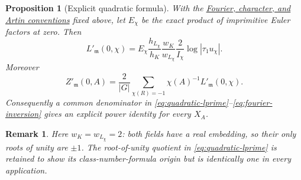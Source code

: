 \documentclass[11pt]{article}
\newtheorem{proposition}[theorem]{Proposition}
\newtheorem{remark}[theorem]{Remark}
\begin{document}
\begin{proposition}[Explicit quadratic formula]\label{prop:A}
With the \hyperref[par:conventions]{Fourier, character, and Artin
conventions} fixed above, let
\(E_\chi\) be the exact product of imprimitive Euler factors at zero.
Then
\begin{equation}\label{eq:quadratic-lprime}
 L'_{\mathfrak m}(0,\chi)=
 E_\chi\frac{h_{L_\chi}}{h_K}
 \frac{w_K}{w_{L_\chi}}\frac{2}{I_\chi}
 \log|\tau_1u_\chi|.
\end{equation}
Moreover
\begin{equation}\label{eq:fourier-inversion}
 Z'_{\mathfrak m}(0,A)=
 \frac{2}{|G|}
 \sum_{\chi(R)=-1}\chi(A)^{-1}
 L'_{\mathfrak m}(0,\chi).
\end{equation}
Consequently a common denominator in
\eqref{eq:quadratic-lprime}--\eqref{eq:fourier-inversion} gives an explicit
power identity for every \(X_A\).
\end{proposition}

\begin{remark}
Here \(w_K=w_{L_\chi}=2\): both fields have a real embedding, so their
only roots of unity are \(\pm1\).  The root-of-unity quotient in
\eqref{eq:quadratic-lprime} is retained to show its
class-number-formula origin but is identically one in every
application.
\end{remark}
\end{document}

